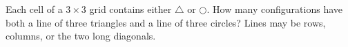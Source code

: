 Each cell of a $3\times3$ grid contains either $\triangle$ or $\bigcirc$. How many configurations have both a line of three triangles and a line of three circles? Lines may be rows, columns, or the two long diagonals.
